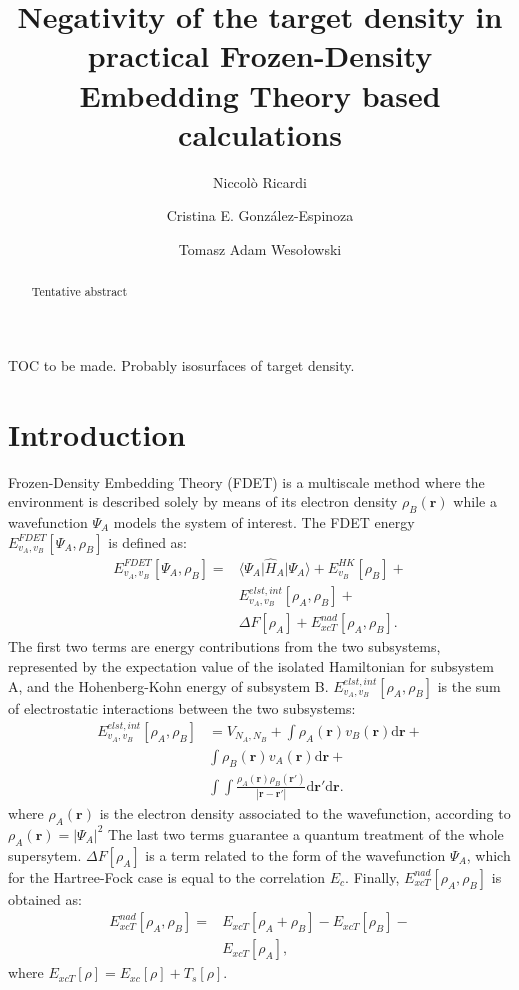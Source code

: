 \documentclass[journal=jctcce,manuscript=article, layout=twocolumn]{achemso}
\author{Niccol\`{o} Ricardi}
\author{Cristina E. Gonz\'{a}lez-Espinoza}
\author{Tomasz Adam Weso\l{}owski}
\affiliation[University of Geneva]
{Department of Physical Chemistry, University of Geneva, Geneva (Switzerland)}
\title[Negativity of the target density]
  {Negativity of the target density in practical Frozen-Density Embedding Theory based calculations}
\begin{document}
\begin{tocentry}

TOC to be made. Probably isosurfaces of target density.

\end{tocentry}


\begin{abstract}
Tentative abstract
\end{abstract}

\section{Introduction}
Frozen-Density Embedding Theory (FDET)\cite{Wesolowski2008, Wesolowski1993} is a multiscale method where the environment is described solely by means of its electron density $\rho_B(\mathbf{r})$ while a wavefunction $\Psi_A$ models the system of interest.
The FDET energy ${E}_{v_A,v_B}^{FDET}[\Psi_{A},\rho_B]$ is defined as:
\begin{align} \label{eq:E_FDET}
{E}_{v_A,v_B}^{FDET}[\Psi_{A},\rho_B] = & \langle\Psi_{A}\vert \hat{H}_A\vert \Psi_{A}\rangle + E^{HK}_{v_B}[\rho_B] + \\ \nonumber
& E^{elst,int}_{v_A,v_B}[\rho_A,\rho_B] + \\ \nonumber
& \Delta F[\rho_A] + E_{xcT}^{nad}[\rho_A,\rho_B]. 
\end{align}
The first two terms are energy contributions from the two subsystems, represented by the expectation value of the isolated Hamiltonian for subsystem A, and the Hohenberg-Kohn energy of subsystem B.
$E^{elst,int}_{v_A,v_B}[\rho_A,\rho_B]$ is the sum of electrostatic interactions between the two subsystems:
\begin{align} \label{eq:E_elst_int}
E^{elst,int}_{v_A,v_B}[\rho_A,\rho_B] & = V_{N_{A},N_{B}} + \int {\rho_A(\mathbf{r})v_B(\mathbf{r})}\mathrm{d}\mathbf{r} + \\ \nonumber
& \int {\rho_B(\mathbf{r})v_A(\mathbf{r})}\mathrm{d}\mathbf{r}   + \\ \nonumber
& \int\int \frac{\rho_A(\mathbf{r})\rho_B(\mathbf{r}')} {\left\vert \mathbf{r}-\mathbf{r}'\right\vert}\mathrm{d}\mathbf{r}'\mathrm{d}\mathbf{r}.
\end{align}
where $\rho_A(\mathbf{r})$ is the electron density associated to the wavefunction, according to $\rho_A(\mathbf{r}) = \vert \Psi_A \vert^2$
The last two terms guarantee a quantum treatment of the whole supersytem. $\Delta F[\rho_A]$ is a term\cite{Aquilante2011} related to the form of the wavefunction $\Psi_A$, which for the Hartree-Fock case is equal to the correlation $E_c$.
Finally, $E_{xcT}^{nad}[\rho_A,\rho_B]$  is obtained as:
\begin{align} \label{eq:E_xct_nad}
 E_{xcT}^{nad}[\rho_A,\rho_B] = & E_{xcT}^{}[\rho_A+\rho_B] - E_{xcT}^{}[\rho_B] - \\ \nonumber
 & E_{xcT}^{}[\rho_A],
\end{align}
where $E_{xcT}[\rho] = E_{xc}[\rho] + T_s[\rho]$.
\end{document}
